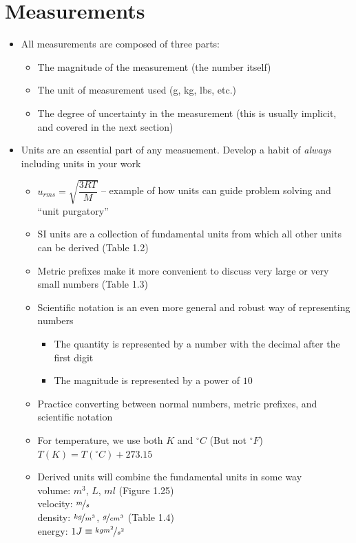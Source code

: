 \documentclass[12pt, openany, letterpaper]{memoir}
\begin{document}
\section{Measurements}
\begin{itemize}
  \item All measurements are composed of three parts:
  \begin{itemize}
    \item The magnitude of the measurement (the number itself)
    \item The unit of measurement used (g, kg, lbs, etc.)
    \item The degree of uncertainty in the measurement (this is usually implicit, and covered in the next section)
  \end{itemize}
  \item Units are an essential part of any measuement. Develop a habit of \emph{always} including units in your work
  \begin{itemize}
    \item $u_{rms}=\sqrt{\dfrac{3RT}{M}}$ -- example of how units can guide problem solving and ``unit purgatory''
    \item SI units are a collection of fundamental units from which all other units can be derived (Table 1.2)
    \item Metric prefixes make it more convenient to discuss very large or very small numbers (Table 1.3)
    \item Scientific notation is an even more general and robust way of representing numbers
    \begin{itemize}
      \item The quantity is represented by a number with the decimal after the first digit
      \item The magnitude is represented by a power of $10$
    \end{itemize}
    \item Practice converting between normal numbers, metric prefixes, and scientific notation
    \item For temperature, we use both $K$ and $^\circ C$ (But not $^\circ F$)
      \\$T(K) = T(^\circ C) + 273.15$ 
    \item Derived units will combine the fundamental units in some way 
      \\volume: $m^3$, $L$, $ml$ (Figure 1.25)
      \\velocity: $\nicefrac{m}{s}$ 
      \\density: $\nicefrac{kg}{m^3}$, $\nicefrac{g}{cm^3}$ (Table 1.4)
      \\energy: $1J\equiv \nicefrac{kgm^2}{s^2}$
  \end{itemize} 
\end{itemize}
\end{document}
